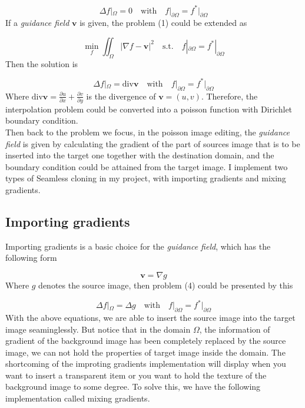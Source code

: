\documentclass[11pt]{article}
\begin{document}
	\begin{equation}
		\Delta f|_\Omega = 0 \quad \text{with} \quad f|_{\partial \Omega} = f^*|_{\partial \Omega}
	\end{equation}
	If a \textit{guidance field} $\boldsymbol{v}$ is given, the problem (1) could be extended as
	
	\begin{equation}
		\min\limits_f \iint_{\Omega}^{} |\nabla f - \boldsymbol{v}|^2 \quad \text{s.t.} \quad f|_{\partial \Omega} = f^*|_{\partial \Omega}
	\end{equation}
	Then the solution is
	
	\begin{equation}
		\Delta f|_{\Omega} = \text{div} \boldsymbol{v} \quad \text{with} \quad f|_{\partial \Omega} = f^*|_{\partial \Omega}
	\end{equation}
	Where $\text{div} \boldsymbol{v} = \frac{\partial u}{\partial x} + \frac{\partial v}{\partial y}$ is the divergence of $\boldsymbol{v} = (u,v)$. Therefore, the interpolation problem could be converted into a poisson function with Dirichlet boundary condition.
	~\\
	Then back to the problem we focus, in the poisson image editing, the \textit{guidance field} is given by calculating the gradient of the part of sources image that is to be inserted into the target one together with the destination domain, and the boundary condition could be attained from the target image. I implement two types of Seamless cloning in my project, with importing gradients and mixing gradients.
	
\subsection{Importing gradients}
	Importing gradients is a basic choice for the \textit{guidance field}, which has the following form
	
	\begin{equation}
		\boldsymbol{v} = \nabla g
	\end{equation}
	Where $g$ denotes the source image, then problem (4) could be presented by this
	
	\begin{equation}
		\Delta f|_{\Omega} = \Delta g \quad \text{with} \quad f|_{\partial \Omega} = f^*|_{\partial \Omega}
	\end{equation}
	With the above equations, we are able to insert the source image into the target image seaminglessly. But notice that in the domain $\Omega$, the information of gradient of the background image has been completely replaced by the source image, we can not hold the properties of target image inside the domain. The shortcoming of the improting gradients implementation will display when you want to insert a transparent item or you want to hold the texture of the background image to some degree. To solve this, we have the following implementation called mixing gradients.
	
\end{document}
